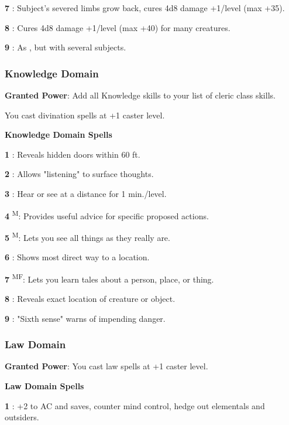 \textbf{7} : Subject's severed limbs grow back, cures 4d8 damage +1/level (max +35).

\textbf{8} : Cures 4d8 damage +1/level (max +40) for many creatures.

\textbf{9} : As , but with several subjects.

\subsubsection{Knowledge Domain}

\textbf{Granted Power}: Add all Knowledge skills to your list of cleric class skills.

You cast divination spells at +1 caster level.

\textbf{Knowledge Domain Spells}

\textbf{1} : Reveals hidden doors within 60 ft.

\textbf{2} : Allows "listening" to surface thoughts.

\textbf{3} : Hear or see at a distance for 1 min./level.

\textbf{4} \textsuperscript{M}: Provides useful advice for specific proposed actions.

\textbf{5} \textsuperscript{M}: Lets you see all things as they really are.

\textbf{6} : Shows most direct way to a location.

\textbf{7} \textsuperscript{M}\textsuperscript{F}: Lets you learn tales about a person, place, or thing.

\textbf{8} : Reveals exact location of creature or object.

\textbf{9} : "Sixth sense" warns of impending danger.

\subsubsection{Law Domain}

\textbf{Granted Power}: You cast law spells at +1 caster level.

\textbf{Law Domain Spells}

\textbf{1} : +2 to AC and saves, counter mind control, hedge out elementals and outsiders.

